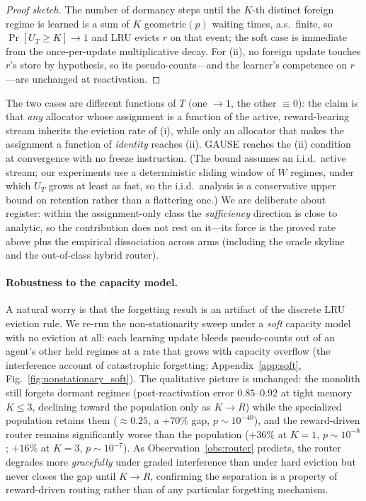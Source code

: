 \documentclass{article}
\begin{document}
\begin{proof}[Proof sketch]
The number of dormancy steps until the $K$-th distinct foreign regime is learned is
a sum of $K$ geometric$(p)$ waiting times, a.s.\ finite, so $\Pr[U_T\ge K]\to1$ and
LRU evicts $r$ on that event; the soft case is immediate from the once-per-update
multiplicative decay. For (ii), no foreign update touches $r$'s store by hypothesis,
so its pseudo-counts---and the learner's competence on $r$---are unchanged at
reactivation. \end{proof}

The two cases are different functions of $T$ (one $\to1$, the other $\equiv0$): the
claim is that \emph{any} allocator whose assignment is a function of the active,
reward-bearing stream inherits the eviction rate of (i), while only an allocator that
makes the assignment a function of \emph{identity} reaches (ii). GAUSE reaches the
(ii) condition at convergence with no freeze instruction. (The bound assumes an
i.i.d.\ active stream; our experiments use a deterministic sliding window of $W$
regimes, under which $U_T$ grows at least as fast, so the i.i.d.\ analysis is a
conservative upper bound on retention rather than a flattering one.) We are deliberate about
register: within the assignment-only class the \emph{sufficiency} direction is close
to analytic, so the contribution does not rest on it---its force is the proved rate
above plus the empirical dissociation across arms (including the oracle skyline and
the out-of-class hybrid router).

\paragraph{Robustness to the capacity model.} A natural worry is that the
forgetting result is an artifact of the discrete LRU eviction rule. We re-run the
non-stationarity sweep under a \emph{soft} capacity model with no eviction at all:
each learning update bleeds pseudo-counts out of an agent's other held regimes at a
rate that grows with capacity overflow (the interference account of catastrophic
forgetting; Appendix~\ref{app:soft}, Fig.~\ref{fig:nonstationary_soft}). The
qualitative picture is unchanged: the monolith still forgets dormant regimes
(post-reactivation error $0.85$--$0.92$ at tight memory $K\le3$, declining toward
the population only as $K\to R$) while the specialized
population retains them ($\approx 0.25$, a $+70\%$ gap, $p\sim10^{-40}$), and the
reward-driven router remains significantly worse than the population
($+36\%$ at $K{=}1$, $p\sim10^{-8}$; $+16\%$ at $K{=}3$, $p\sim10^{-7}$). As
Observation~\ref{obs:router} predicts, the router degrades more \emph{gracefully}
under graded interference than under hard eviction but never closes the gap until
$K\to R$, confirming the separation is a property of reward-driven routing rather
than of any particular forgetting mechanism.
\end{document}

